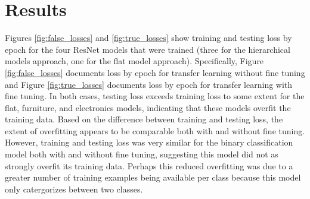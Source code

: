 \section{Results}
%







Figures \ref{fig:false_losses} and \ref{fig:true_losses} show training and testing loss by epoch for the four ResNet models that were trained (three for the hierarchical models approach, one for the flat model approach). 
Specifically, Figure \ref{fig:false_losses} documents loss by epoch for transfer learning without fine tuning and Figure \ref{fig:true_losses} documents loss by epoch for transfer learning with fine tuning.
In both cases, testing loss exceeds training loss to some extent for the flat, furniture, and electronics models, indicating that these models overfit the training data.
Based on the difference between training and testing loss, the extent of overfitting appears to be comparable both with and without fine tuning.
However, training and testing loss was very similar for the binary classification model both with and without fine tuning, suggesting this model did not as strongly overfit its training data.
Perhaps this reduced overfitting was due to a greater number of training examples being available per class because this model only catergorizes between two classes.

